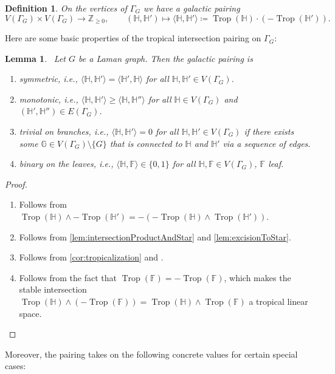 \documentclass[11pt,reqno,a4paper]{amsart}
\theoremstyle{theoremstyle}
\newtheorem{lemma}[theorem]{Lemma}
\theoremstyle{examplestyle}
\newtheorem{definition}[theorem]{Definition}
\theoremstyle{algorithmstyle}
\newcommand{\FF}{\mathbb{F}}
\newcommand{\GG}{\mathbb{G}}
\newcommand{\HH}{\mathbb{H}}
\newcommand{\ZZ}{\mathbb{Z}}
\DeclareMathOperator{\Trop}{Trop}
\begin{document}
\begin{definition}
  \label{def:tropicalPairing}
  On the vertices of $\Gamma_G$ we have a \emph{galactic pairing}
  \begin{equation*}
    V(\Gamma_G) \times V(\Gamma_G) \longrightarrow \ZZ_{\geq 0},\qquad (\HH,\HH')\longmapsto \langle\HH,\HH'\rangle\coloneqq \Trop(\HH)\cdot (-\Trop(\HH')).
  \end{equation*}
\end{definition}

Here are some basic properties of the tropical intersection pairing on $\Gamma_G$:
\begin{lemma}
  \label{lem:tropicalPairing}\
  Let $G$ be a Laman graph.  Then the galactic pairing is
  \begin{enumerate}
  \item symmetric, i.e., $\langle\HH,\HH'\rangle = \langle\HH',\HH\rangle$ for all $\HH,\HH'\in V(\Gamma_G)$.
  \item monotonic, i.e., $\langle\HH,\HH'\rangle \geq \langle\HH,\HH''\rangle$ for all $\HH\in V(\Gamma_G)$ and $(\HH',\HH'')\in E(\Gamma_G)$.
  \item trivial on branches, i.e., $\langle\HH,\HH'\rangle = 0$ for all $\HH,\HH'\in V(\Gamma_G)$ if there exists some $\GG\in V(\Gamma_G)\setminus\{G\}$ that is connected to $\HH$ and $\HH'$ via a sequence of edges.
  \item binary on the leaves, i.e., $\langle\HH,\FF\rangle\in\{0,1\}$ for all $\HH,\FF \in V(\Gamma_G)$, $\FF$ leaf.
  \end{enumerate}
\end{lemma}
\begin{proof}\
  \begin{enumerate}
  \item Follows from $\Trop(\HH)\wedge -\Trop(\HH') = -(-\Trop(\HH) \wedge \Trop(\HH'))$.
  \item Follows from \cref{lem:intersectionProductAndStar} and \cref{lem:excisionToStar}.
  \item Follows from \cref{cor:tropicalization} and \cite[Theorem 3.6.10]{MaclaganSturmfels2015}.
  \item Follows from the fact that $\Trop(\FF)=-\Trop(\FF)$, which makes the stable intersection $\Trop(\HH)\wedge(-\Trop(\FF)) = \Trop(\HH)\wedge \Trop(\FF)$ a tropical linear space. \qedhere
  \end{enumerate}
\end{proof}

Moreover, the pairing takes on the following concrete values for certain special cases:
\end{document}
